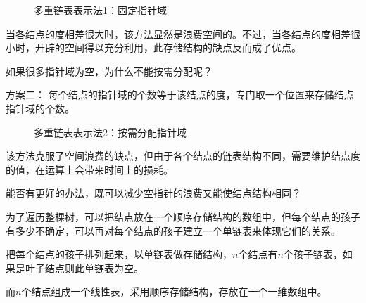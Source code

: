 \begin{frame}
\begin{small}
\begin{figure}
\centering

\caption{多重链表表示法1：固定指针域}
\end{figure}
\end{small}
\end{frame}
%
%
\begin{frame}
当各结点的度相差很大时，该方法显然是浪费空间的。不过，当各结点的度相差很小时，开辟的空间得以充分利用，此存储结构的缺点反而成了优点。\vspace{0.2in}

\pause 
\begin{wenti}
如果很多指针域为空，为什么不能按需分配呢？
\end{wenti}
\end{frame}
%
\begin{frame}
\textcolor{acolor3}{方案二：}
每个结点的指针域的个数等于该结点的度，专门取一个位置来存储结点指针域的个数。
\begin{figure}
\centering
        
\end{figure}

\end{frame}
%
\begin{frame}
\begin{figure}
\centering

\caption{多重链表表示法2：按需分配指针域}
\end{figure}
\end{frame}
%
\begin{frame}
该方法克服了空间浪费的缺点，但由于各个结点的链表结构不同，需要维护结点度的值，在运算上会带来时间上的损耗。\vspace{0.2in}

\pause 
\begin{wenti}
能否有更好的办法，既可以减少空指针的浪费又能使结点结构相同？
\end{wenti}\vspace{0.2in}

\pause
为了遍历整棵树，可以把结点放在一个顺序存储结构的数组中，但每个结点的孩子有多少不确定，可以再对每个结点的孩子建立一个单链表来体现它们的关系。
\end{frame}
%
%
%
\begin{frame}

把每个结点的孩子排列起来，以单链表做存储结构，$n$个结点有$n$个孩子链表，如果是叶子结点则此单链表为空。

而$n$个结点组成一个线性表，采用顺序存储结构，存放在一个一维数组中。
\end{frame}

